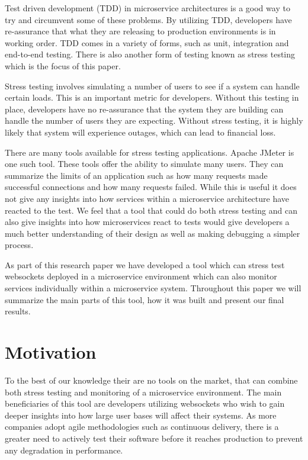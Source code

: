 Test driven development (TDD) in microservice architectures is a good way to try and circumvent some of these problems. By utilizing TDD, developers have re-assurance that what they are releasing to production environments is in working order. TDD comes in a variety of forms, such as unit, integration and end-to-end testing. There is also another form of testing known as stress testing which is the focus of this paper. 

Stress testing involves simulating a number of users to see if a system can handle certain loads. This is an important metric for developers. Without this testing in place, developers have no re-assurance that the system they are building can handle the number of users they are expecting. Without stress testing, it is highly likely that system will experience outages, which can lead to financial loss.

There are many tools available for stress testing applications. Apache JMeter is one such tool. These tools offer the ability to simulate many users. They can summarize the limits of an application such as how many requests made successful connections and how many requests failed. While this is useful it does not give any insights into how services within a microservice architecture have reacted to the test. We feel that a tool that could do both stress testing and can also give insights into how microservices react to tests would give developers a much better understanding of their design as well as making debugging a simpler process.

As part of this research paper we have developed a tool which can stress test websockets deployed in a microservice environment which can also monitor services individually within a microservice system. Throughout this paper we will summarize the main parts of this tool, how it was built and present our final results.

\section{Motivation}

To the best of our knowledge their are no tools on the market, that can combine both stress testing and monitoring of a microservice environment. The main beneficiaries of this tool are developers utilizing websockets who wish to gain deeper insights into how large user bases will affect their systems. As more companies adopt agile methodologies such as continuous delivery, there is a greater need to actively test their software before it reaches production to prevent any degradation in performance.

